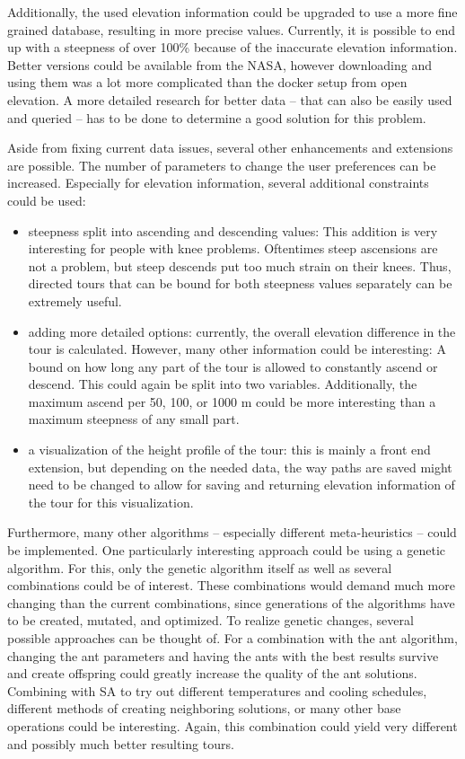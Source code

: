 Additionally, the used elevation information could be upgraded to use a more fine grained database, resulting in more precise values. 
Currently, it is possible to end up with a steepness of over 100\% because of the inaccurate elevation information.
Better versions could be available from the NASA, however downloading and using them was a lot more complicated than the docker setup from open elevation.
A more detailed research for better data -- that can also be easily used and queried -- has to be done to determine a good solution for this problem.

Aside from fixing current data issues, several other enhancements and extensions are possible.
The number of parameters to change the user preferences can be increased. 
Especially for elevation information, several additional constraints could be used:
\begin{itemize}
	\item steepness split into ascending and descending values: This addition is very interesting for people with knee problems. Oftentimes steep ascensions are not a problem, but steep descends put too much strain on their knees. Thus, directed tours that can be bound for both steepness values separately can be extremely useful.
	\item adding more detailed options: currently, the overall elevation difference in the tour is calculated. However, many other information could be interesting:
	 A bound on how long any part of the tour is allowed to constantly ascend or descend. This could again be split into two variables.
	Additionally, the maximum ascend per 50, 100, or 1000 m could be more interesting than a maximum steepness of any small part.
	\item a visualization of the height profile of the tour: this is mainly a front end extension, but depending on the needed data, the way paths are saved might need to be changed to allow for saving and returning elevation information of the tour for this visualization.
\end{itemize}

Furthermore, many other algorithms -- especially different meta-heuristics -- could be implemented. 
One particularly interesting approach could be using a genetic algorithm.
For this, only the genetic algorithm itself as well as several combinations could be of interest. 
These combinations would demand much more changing than the current combinations, since generations of the algorithms have to be created, mutated, and optimized. 
To realize genetic changes, several possible approaches can be thought of. 
For a combination with the ant algorithm, changing the ant parameters and having the ants with the best results survive and create offspring could greatly increase the quality of the ant solutions.
Combining with SA to try out different temperatures and cooling schedules, different methods of creating neighboring solutions, or many other base operations could be interesting.
Again, this combination could yield very different and possibly much better resulting tours.

